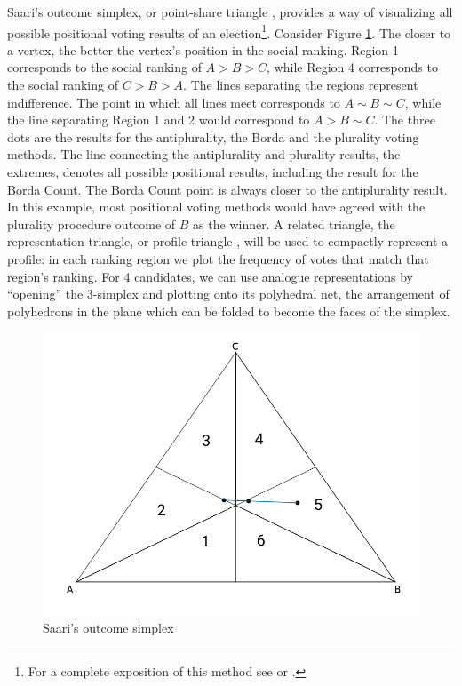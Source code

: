\documentclass[hidelinks,11pt]{article}
\begin{document}
Saari's outcome simplex, or point-share triangle
\parencite{eggers20_diagr_analy_ordin_votin_system}, provides a way of
visualizing all possible positional voting results of an election\footnote{For a
  complete exposition of this method see \textcite{saari1995basic} or
  \textcite{nurmi2002voting}.}. Consider Figure \ref{fig:saari_nurmi}. The
closer to a vertex, the better the vertex's position in the social ranking.
Region 1 corresponds to the social ranking of \(A > B > C\), while Region 4
corresponds to the social ranking of \(C>B>A\). The lines separating the regions
represent indifference. The point in which all lines meet corresponds to
\(A \sim B \sim C\), while the line separating Region 1 and 2 would correspond
to \(A > B \sim C\). The three dots are the results for the antiplurality, the
Borda and the plurality voting methods. The line connecting the antiplurality
and plurality results, the extremes, denotes all possible positional results,
including the result for the Borda Count. The Borda Count point is always closer
to the antiplurality result. In this example, most positional voting methods
would have agreed with the plurality procedure outcome of \(B\) as the winner. A
related triangle, the representation triangle, or profile triangle
\parencite{eggers20_diagr_analy_ordin_votin_system}, will be used to compactly
represent a profile: in each ranking region we plot the frequency of votes that
match that region's ranking. For 4 candidates, we can use analogue
representations by ``opening'' the 3-simplex and plotting onto its polyhedral
net, the arrangement of polyhedrons in the plane which can be folded to become
the faces of the simplex.

\begin{figure}[H]
 \centering
 \includegraphics[width=0.8\columnwidth,
 height=0.3\textheight]{./images/simpletriangle.png}
 \caption{Saari's outcome simplex}
 \label{fig:saari_nurmi}
\end{figure}
\end{document}

